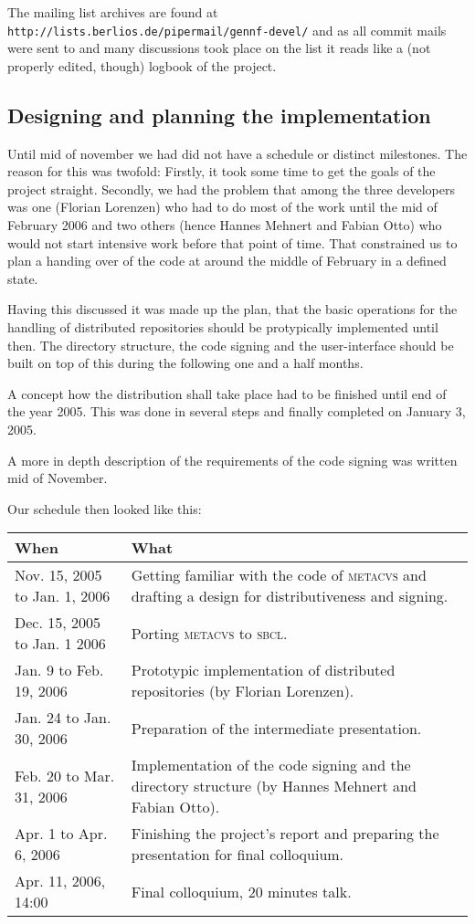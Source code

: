 \documentclass[fleqn, 10pt, a4paper]{report} \usepackage{amssymb}
\begin{document}
The mailing list archives are found at
\texttt{http://lists.berlios.de/pipermail/gennf-devel/} and as all
commit mails were sent to and many discussions took place on the list
it reads like a (not properly edited, though) logbook of the project.

\subsection{Designing and planning the implementation}

Until mid of november we had did not have a schedule or distinct
milestones. The reason for this was twofold: Firstly, it took some
time to get the goals of the project straight. Secondly, we had the
problem that among the three developers was one (Florian Lorenzen) who
had to do most of the work until the mid of February 2006 and two
others (hence Hannes Mehnert and Fabian Otto) who would not start
intensive work before that point of time. That constrained us to plan
a handing over of the code at around the middle of February in a
defined state.

Having this discussed it was made up the plan, that the basic
operations for the handling of distributed repositories should be
protypically implemented until then. The directory structure, the code
signing and the user-interface should be built on top of this during the
following one and a half months.

A concept how the distribution shall take place had to be finished
until end of the year 2005. This was done in several steps and finally
completed on January 3, 2005.

A more in depth description of the requirements of the code signing
was written mid of November.

Our schedule then looked like this: \bigskip

\begin{tabular}{|p{}|p{}|}
  \hline
  \textmd{When} & \textmd{What} \\
  \hline\hline
  Nov. 15, 2005 to Jan. 1, 2006 &
  Getting familiar with the code of \textsc{metacvs}
  and drafting a design for distributiveness and signing. \\
  \hline
  Dec. 15, 2005 to Jan. 1 2006 &
  Porting \textsc{metacvs} to \textsc{sbcl}. \\
  \hline
  Jan. 9 to Feb. 19, 2006 & Prototypic implementation of
  distributed repositories (by Florian Lorenzen). \\
  \hline
  Jan. 24 to Jan. 30, 2006 & Preparation of the intermediate
  presentation. \\
  \hline
  Feb. 20 to Mar. 31, 2006 & Implementation of the code signing
  and the directory structure (by Hannes Mehnert and Fabian Otto). \\
  \hline
  Apr. 1 to Apr. 6, 2006 & Finishing the project's report
  and preparing the presentation for final colloquium. \\
  \hline
  Apr. 11, 2006, 14:00 & Final colloquium, 20 minutes talk. \\
  \hline
\end{tabular}
\end{document}
